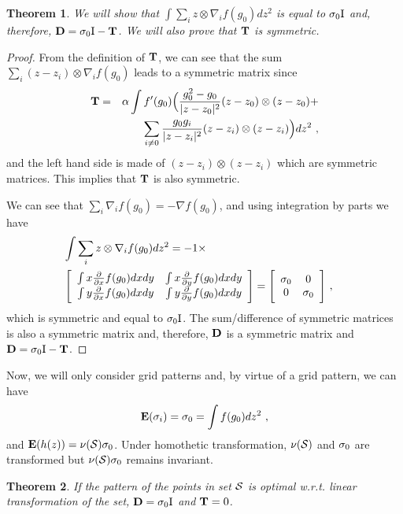 \documentclass[12pt,english]{article}
\newtheorem{theorem}{Theorem}[section]
\begin{document}
\begin{theorem}
We will show that $\int \sum_{i} z\otimes \nabla_i f(g_0)dz^2$ is equal to $\ss_0\BI$ and, therefore, $\BD=\ss_0\BI-\BT$. We will also prove that $\BT$ is symmetric. 
\end{theorem}

\begin{proof}
From the definition of $\BT$, we can see that the sum \mbox{$\sum_i (z-z_i)\otimes \nabla_i f(g_0)$} leads to a symmetric matrix since
\begin{eqnarray*}
\BT&=&\alpha\int f'(g_0)\Big(\frac{g_0^2-g_0}{|z-z_0|^2}(z-z_0)\otimes(z-z_0)+\\
&&\sum_{i\neq 0}\frac{g_0g_i}{|z-z_i|^2}(z-z_i)\otimes(z-z_i)\Big)dz^2~,
\end{eqnarray*}
and the left hand side is made of \mbox{$(z-z_i)\otimes(z-z_i)$} which are symmetric matrices. This implies that $\BT$ is also symmetric.

We can see that \mbox{$\sum_{i}\nabla_i f(g_0)=-\nabla f(g_0)$}, and using integration by parts we have
\begin{eqnarray*}
\lefteqn{\int \sum_i z\otimes \nabla_i f(g_0)dz^2=-1\times}\\
&\Biggl[
\begin{array}{cc}
\int x \fpx f(g_0)dxdy&\int x \fpy f(g_0)dxdy\\
\int y \fpx f(g_0)dxdy&\int y \fpy f(g_0)dxdy
\end{array}
\Biggr]=
\Biggl[\begin{array}{cc}
\ss_0&0\\
0&\ss_0
\end{array}\Biggr]~,\end{eqnarray*}
which is symmetric and equal to $\ss_0\BI$. The sum/difference of symmetric matrices is also a symmetric matrix and, therefore, $\BD$ is a symmetric matrix and $\BD=\ss_0\BI-\BT$. 
\end{proof}



Now, we will only consider grid patterns and, by virtue of a grid pattern, we can have 
$$\E(\ss_i)=\ss_0=\int f(g_0)dz^2~,
$$ 
and \mbox{$\E(h(z))=\nu({\cal S})\ss_0$}. Under homothetic transformation, $\nu({\cal S})$ and $\ss_0$ are transformed but $\nu({\cal S})\ss_0$ remains invariant.

\begin{theorem}
If the pattern of the points in set ${\cal S}$ is optimal w.r.t. linear transformation of the set, $\BD=\ss_0\BI$ and $\BT=0$.
\end{theorem}
\end{document}
